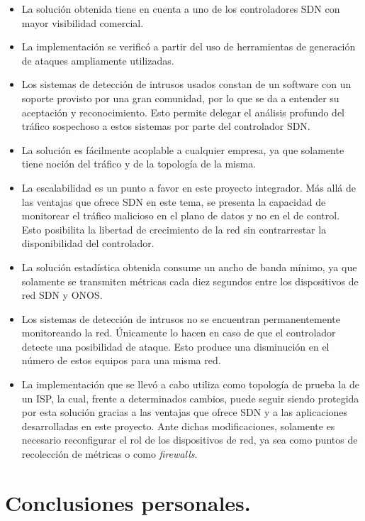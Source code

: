 \begin{itemize}
    \item{La solución obtenida tiene en cuenta a uno de los controladores SDN con mayor visibilidad comercial.}
    \item{La implementación se verificó a partir del uso de herramientas de
        generación de ataques ampliamente utilizadas.}
    \item{Los sistemas de detección de intrusos usados constan de un software
        con un soporte provisto por una gran comunidad, por lo que se da a
        entender su aceptación y reconocimiento. Esto permite delegar el
        análisis profundo del tráfico sospechoso a estos sistemas por parte del
        controlador SDN.}
    \item{La solución es fácilmente acoplable a cualquier empresa, ya que
        solamente tiene noción del tráfico y de la topología de la misma.}
    \item{La escalabilidad es un punto a favor en este proyecto integrador. Más
        allá de las ventajas que ofrece SDN en este tema, se presenta la
        capacidad de monitorear el tráfico malicioso en el
        plano de datos y no en el de control. Esto posibilita la libertad de
        crecimiento de la red sin contrarrestar la disponibilidad del
        controlador.}
    \item{La solución estadística obtenida consume un ancho de banda mínimo, ya
        que solamente se transmiten métricas cada diez segundos entre los
        dispositivos de red SDN y ONOS.}
    \item{Los sistemas de detección de intrusos no se encuentran permanentemente
        monitoreando la red. Únicamente lo hacen en caso de que el controlador
        detecte una posibilidad de ataque. Esto produce una disminución en el
        número de estos equipos para una misma red.}
    \item{La implementación que se llevó a cabo utiliza como topología de prueba la de un ISP, la cual, frente a determinados cambios, puede seguir siendo protegida por esta solución gracias a las ventajas que ofrece SDN y a las aplicaciones desarrolladas en este proyecto. Ante dichas modificaciones, solamente es necesario reconfigurar el rol de los dispositivos de red, ya sea como puntos de recolección de métricas o como \textit{firewalls}.} 
    
\end{itemize}



\section{Conclusiones personales.} \label{sec:conclusionespersonales}


